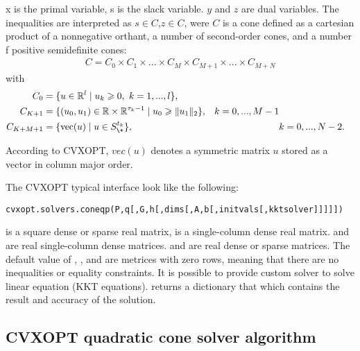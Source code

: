 x is the primal variable, s is the slack variable. $y$ and $z$ are dual variables. The inequalities are interpreted as $s\in C$,$z\in C$, were $C$ is a cone defined as a cartesian product of a nonnegative orthant, a number of second-order cones, and a number f positive semidefinite cones:
\begin{equation*}
	\begin{aligned}
		C = C_0 \times C_1 \times ... \times C_M \times C_{M+1}\times ... \times C_{M+N}
	\end{aligned}
\end{equation*}
with
\begin{equation*}
	\begin{aligned}
		C_0 &= \lbrace u\in \mathbb{R}^l \mid u_k \geqslant 0, \text{ }k=1,...,l \rbrace,\\
		C_{K+1} &= \lbrace (u_0,u_1) \in \mathbb{R}\times \mathbb{R}^{\tau_k-1} \mid u_0 \geqslant \| u_1\|_2 \rbrace , & k=0,...,M-1\\
		C_{K+M+1} &=\lbrace \text{vec}(u) \mid u\in S_{\+}^{t_k}\rbrace, & & k=0,...,N-2.
	\end{aligned}
\end{equation*}

According to CVXOPT, $vec(u)$ denotes a symmetric matrix $u$ stored as a vector in column major order.

The CVXOPT typical  interface look like the following:

\begin{lstlisting}
cvxopt.solvers.coneqp(P,q[,G,h[,dims[,A,b[,initvals[,kktsolver]]]]])	
\end{lstlisting}

 is a square dense or sparse real matrix,  is a single-column dense real matrix.  and  are real single-column dense matrices.  and  are real dense or sparse matrices. The default value of , , and  are metrices with zero rows, meaning that there are no inequalities or equality constraints. It is possible to provide custom solver to solve linear equation (KKT equations).  returns a dictionary that which contains the result and accuracy of the solution.

\subsection{CVXOPT quadratic cone solver algorithm}

